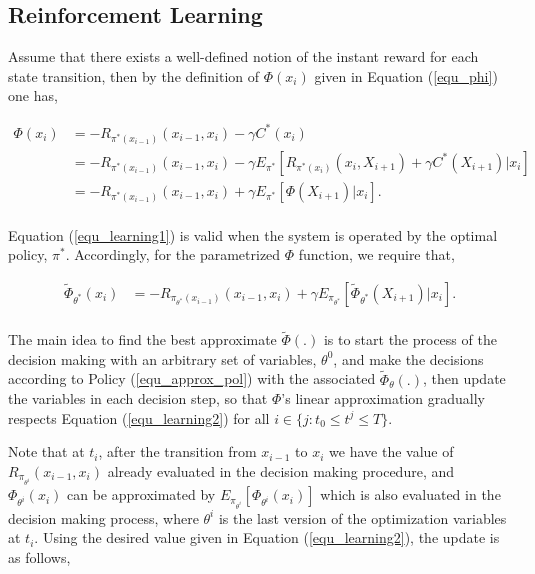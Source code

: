 \documentclass[12pt]{aastex62}
\theoremstyle{definition}
\begin{document}
\subsection{Reinforcement Learning}

Assume that there exists a well-defined notion of the instant reward for each state transition, then by the definition of $\Phi(x_{{i}})$ given in Equation (\ref{equ_phi}) one has,

\begin{equation} \label{equ_learning1}
\begin{aligned}
\Phi(x_{i}) &= - R_{\pi^*(x_{i-1})}(x_{i-1},x_i) - \gamma C^*({x_{i}})\\
&= - R_{\pi^*(x_{i-1})}(x_{i-1},x_i) - \gamma E_{\pi^*}[R_{\pi^*(x_{i})}(x_{i},X_{i+1})  +\gamma C^*({X_{{i+1}}})|x_i]\\
&= - R_{\pi^*(x_{i-1})}(x_{i-1},x_i)  + \gamma E_{\pi^*}[\Phi(X_{{i+1}})|x_i].\\
\end{aligned}
\end{equation}

Equation (\ref{equ_learning1}) is valid when the system is operated by the optimal policy, $\pi^*$. Accordingly, for the parametrized $\Phi$ function, we require that,


\begin{equation} \label{equ_learning2}
\begin{aligned}
\tilde \Phi_{\theta^*}(x_{i}) &=  - R_{\pi_{\theta^*}(x_{i-1})}(x_{i-1},x_i)  + \gamma E_{\pi_{\theta^*}}[\tilde \Phi_{\theta^*}(X_{{i+1}})|x_i].\\
\end{aligned}
\end{equation}

The main idea to find the best approximate $\tilde {\Phi}(.)$ is to start the process of the decision making with an arbitrary set of variables, $\theta^0$, and make the decisions according to Policy (\ref{equ_approx_pol}) with the associated $\tilde \Phi_{\theta}(.)$, then update the variables in each decision step, so that $\Phi$'s linear approximation gradually respects Equation (\ref{equ_learning2}) for all $i \in \{j: t_0 \leq t^j \leq T\}$.

Note that at $t_i$, after the transition from $x_{{i-1}}$ to $x_{{i}}$ we have the value of $R_{\pi_{\theta^i}}(x_{i-1},x_i) $ already evaluated in the decision making procedure, and  $\Phi_{\theta^i}(x_{i})$ can be approximated by $E_{\pi_{\theta^i}}[ \Phi_{\theta^i}(x_{i})]$ which is also evaluated in the decision making process, where $\theta^i$ is the last version of the optimization variables at $t_i$. Using the desired value given in Equation (\ref{equ_learning2}), the update is as follows,
\end{document}
